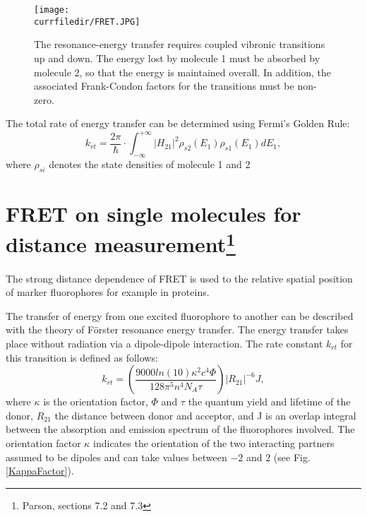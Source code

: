 \begin{figure}
\label{Resonance}
\center
    \texttt{[image: \\currfiledir/FRET.JPG]}
    \caption{The resonance-energy transfer requires coupled vibronic transitions up and down. The energy lost by molecule 1 must be absorbed by molecule 2, so that the energy is maintained overall. In addition, the associated Frank-Condon factors for the transitions must be non-zero.}
\end{figure}

The total rate of energy transfer can be determined using Fermi's Golden Rule:
\begin{equation*}
    k_{rt} = \frac{2\pi}{\hbar} \cdot \int_{-\infty}^{+\infty} |H_{21}|^2 \rho_{s2}(E_1) \rho_{s1}(E_1) dE_1,
\end{equation*}
where $\rho_{si}$ denotes the state densities of molecule 1 and 2

\section{FRET on single molecules for distance measurement\protect\footnote{Parson, sections 7.2 and 7.3}} 

The strong distance dependence of FRET is used to
the relative spatial position of marker fluorophores
for example in proteins.

The transfer of energy from one excited fluorophore to another can be described with the theory of Förster resonance energy transfer. The energy transfer takes place without radiation via a dipole-dipole interaction. The rate constant $k_{rt}$ for this transition is defined as follows:
\begin{equation}
    k_{rt}=\left( \frac{9000 ln(10)\kappa^2c^4\Phi}{128\pi^5n^4N_A\tau} \right) |R_{21}|^{-6}J ,
\end{equation}
where $\kappa$ is the orientation factor, $\Phi$ and $\tau$ the quantum yield and lifetime of the donor, $R_{21}$ the distance between donor and acceptor, and J is an overlap integral between the absorption and emission spectrum of the fluorophores involved. The orientation factor $\kappa$ indicates the orientation of the two interacting partners assumed to be dipoles and can take values between $-2$ and $2$ (see Fig. \ref{KappaFactor}). 


